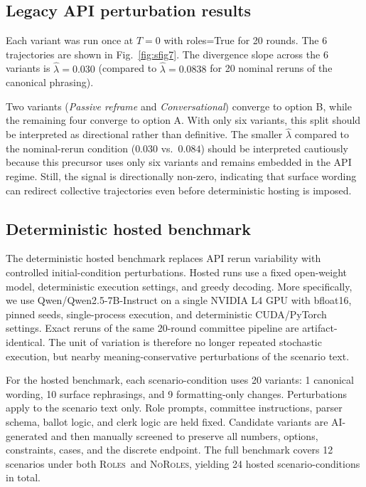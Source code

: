 \documentclass[11pt,onecolumn]{article}
\newcommand{\lam}{\ensuremath{\hat{\lambda}}}
\newcommand{\Roles}{\textsc{Roles}}
\newcommand{\NoRoles}{\textsc{NoRoles}}
\begin{document}
\subsection{Legacy API perturbation results}

Each variant was run once at $T = 0$ with roles=True for 20 rounds.
The 6 trajectories are shown in Fig.~\ref{fig:sfig7}.
The divergence slope across the 6 variants is
$\lam = 0.030$ (compared to $\lam = 0.0838$ for 20 nominal reruns of the
canonical phrasing).

Two variants (\textit{Passive reframe} and \textit{Conversational}) converge
to option B, while the remaining four converge to option A.
With only six variants, this split should be interpreted as directional rather
than definitive.
The smaller $\lam$ compared to the nominal-rerun condition ($0.030$ vs.\ $0.084$)
should be interpreted cautiously because this precursor uses only six variants
and remains embedded in the API regime. Still, the signal is directionally
non-zero, indicating that surface wording can redirect collective trajectories
even before deterministic hosting is imposed.

\subsection{Deterministic hosted benchmark}

The deterministic hosted benchmark replaces API rerun variability with
controlled initial-condition perturbations. Hosted runs use a fixed open-weight
model, deterministic execution settings, and greedy decoding. More
specifically, we use Qwen/Qwen2.5-7B-Instruct on a single NVIDIA L4 GPU with
bfloat16, pinned seeds, single-process execution, and deterministic
CUDA/PyTorch settings. Exact reruns of the same 20-round committee pipeline are
artifact-identical. The unit of variation is therefore no longer repeated
stochastic execution, but nearby meaning-conservative perturbations of the
scenario text.

For the hosted benchmark, each scenario-condition uses 20 variants:
1 canonical wording, 10 surface rephrasings, and 9 formatting-only changes.
Perturbations apply to the scenario text only. Role prompts, committee
instructions, parser schema, ballot logic, and clerk logic are held fixed.
Candidate variants are AI-generated and then manually screened to preserve all
numbers, options, constraints, cases, and the discrete endpoint.
The full benchmark covers 12 scenarios under both \Roles\ and \NoRoles,
yielding 24 hosted scenario-conditions in total.
\end{document}
